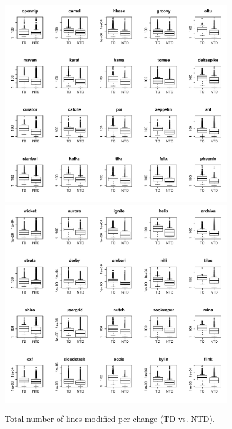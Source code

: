 \begin{figure}[tb]
	\centering
	\includegraphics[width=100mm]{figures/chapter4/rq3_td_churn_logged_1}
	\includegraphics[width=100mm]{figures/chapter4/rq3_td_churn_logged_2}
	\caption{Total number of lines modified per change (TD vs. NTD).}
	\label{figure:total_number_of_lines_changed_td_vs_ntd}
\end{figure}


